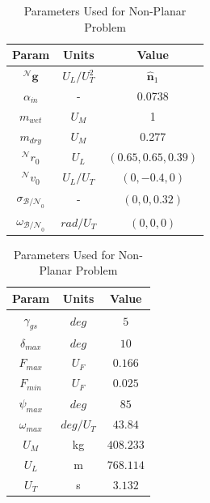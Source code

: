 \begin{table}[ht]
  \caption{Parameters Used for Non-Planar Problem}
  \centering 
  \begin{tabular}{c c c} 
    \hline\hline
    Param & Units & Value \\ [0.5ex] 
    \hline 
    $^\mathcal{N}\mathbf{g}$ 		& $U_L/U_T^2$ 	& $\hat{\mathbf{n}}_1$  \\ 
    $\alpha_{\dot{m}}$ 				& - 			& 0.0738  \\
    $m_{wet}$ 						& $U_M$ 		& 1  \\
    $m_{dry}$ 						& $U_M$ 		& 0.277  \\
    $^\mathcal{N}r_{0}$ 			& $U_L$ 		& $(0.65,0.65,0.39)$  \\
    $^\mathcal{N}v_{0}$ 			& $U_L/U_T$	 	& $(0,-0.4,0)$  \\
    $\sigma_{\mathcal{B/N}_0}$ 		& - 			& $(0,0,0.32)$  \\
    $\omega_{\mathcal{B/N}_0}$ 		& $rad/U_T$ 	& $(0,0,0)$ \\[1ex] 
    \hline
    \end{tabular}
    \begin{tabular}{c c c} 
    \hline\hline
    Param & Units & Value \\ [0.5ex] 
    \hline 
    $\gamma_{gs}$ 					& $deg$ 		& $5$  \\ 
    $\delta_{max}$	 				& $deg$ 		& $10$  \\
    $F_{max}$ 						& $U_F$ 		& $0.166$ \\
    $F_{min}$ 						& $U_F$ 		& $0.025$  \\
    $\psi_{max}$ 					& $deg$ 		& $85$  \\
    $\omega_{max}$ 					& $deg/U_T$	 	& $43.84$  \\
    $U_M$ 							& kg 			& $408.233$  \\
    $U_L$					 		& m			 	& $768.114$ \\
    $U_T$					 		& s			 	& $3.132$ \\[1ex] 
    \hline
  \end{tabular}
  \label{table:tablenplanar}
\end{table}










